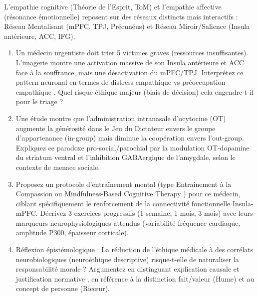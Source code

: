 \documentclass[11pt]{article}
\begin{document}
\begin{exercice}
L'empathie cognitive (Théorie de l'Esprit, ToM) et l'empathie affective (résonance émotionnelle) reposent sur des réseaux distincts mais interactifs : Réseau Mentalisant (mPFC, TPJ, Précunéus) et Réseau Miroir/Salience (Insula antérieure, ACC, IFG).

\begin{enumerate}
\item Un médecin urgentiste doit trier 5 victimes graves (ressources insuffisantes). L'imagerie montre une activation massive de son Insula antérieure et ACC face à la souffrance, mais une désactivation du mPFC/TPJ. Interprétez ce pattern neuronal en termes de \og distress empathique \fg vs \og préoccupation empathique \fg. Quel risque éthique majeur (biais de décision) cela engendre-t-il pour le triage ?
\item Une étude montre que l'administration intranasale d'ocytocine (OT) augmente la générosité dans le Jeu du Dictateur envers le groupe d'appartenance (in-group) mais diminue la coopération envers l'out-group. Expliquez ce paradoxe pro-social/parochial par la modulation OT-dopamine du striatum ventral et l'inhibition GABAergique de l'amygdale, selon le contexte de menace sociale.
\item Proposez un protocole d'entraînement mental (type \og Entraînement à la Compassion \fg ou \og Mindfulness-Based Cognitive Therapy \fg) pour ce médecin, ciblant spécifiquement le renforcement de la connectivité fonctionnelle Insula-mPFC. Décrivez 3 exercices progressifs (1 semaine, 1 mois, 3 mois) avec leurs marqueurs neurophysiologiques attendus (variabilité fréquence cardiaque, amplitude P300, épaisseur corticale).
\item Réflexion épistémologique : La réduction de l'éthique médicale à des corrélats neurobiologiques (neuroéthique descriptive) risque-t-elle de naturaliser la responsabilité morale ? Argumentez en distinguant \og explication causale \fg et \og justification normative \fg, en référence à la distinction fait/valeur (Hume) et au concept de \og personne \fg (Ricœur).
\end{enumerate}
\end{exercice}
\end{document}
